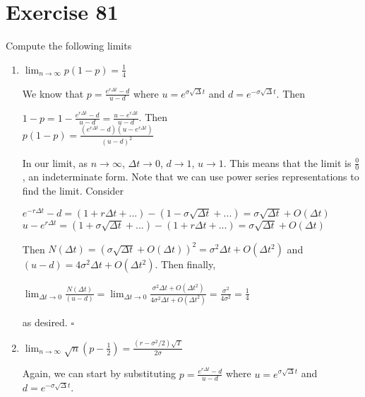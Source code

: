 \documentclass{article}
\begin{document}
\section*{Exercise 81}
Compute the following limits
\begin{enumerate}
    \item $\lim_{n \rightarrow \infty} p(1-p) = \frac{1}{4}$
        \begin{flushleft}
            We know that $p = \frac{e^{r\Delta t} - d}{u-d}$ where $u = e^{\sigma \sqrt{\Delta}t}$ and $d = e^{- \sigma \sqrt{\Delta}t}$. Then
            \begin{center}
                $1-p = 1 - \frac{e^{r\Delta t} - d}{u-d} = \frac{u - e^{r \Delta t}}{u-d}$. Then \\
                $p(1-p) = \frac{(e^{r\Delta t} - d)(u - e^{r \Delta t})}{(u-d)^2}$
            \end{center}
            In our limit, as $n \rightarrow \infty$, $\Delta t \rightarrow 0$, $d \rightarrow 1$, $u \rightarrow 1$. This means that the limit is $\frac{0}{0}$, an indeterminate form.
            Note that we can use power series representations to find the limit. Consider
            \begin{center}
                $e^{-r\Delta t} - d = (1 + r\Delta t + ...) - (1 - \sigma \sqrt{\Delta t} + ...) = \sigma \sqrt{\Delta t} + O(\Delta t)$ \\
                $u - e^{r\Delta t} = (1 + \sigma \sqrt{\Delta t} + ...) - (1 + r\Delta t + ...) = \sigma \sqrt{\Delta t} + O(\Delta t)$
            \end{center}
            Then $N(\Delta t) = (\sigma \sqrt{\Delta t} + O(\Delta t))^2 = \sigma^2 \Delta t + O(\Delta t^2)$ and $(u-d) = 4\sigma^2\Delta t + O(\Delta t^2)$. Then finally,
            \begin{center}
                $\lim_{\Delta t \rightarrow 0} \frac{N(\Delta t)}{(u-d)} = \lim_{\Delta t \rightarrow 0} \frac{\sigma^2 \Delta t + O(\Delta t^2)}{4\sigma^2\Delta t + O(\Delta t^2)} = \frac{\sigma^2}{4\sigma^2} = \frac{1}{4}$
            \end{center}
            as desired. $\square$
        \end{flushleft}
    \item $\lim_{n \rightarrow \infty} \sqrt{n}(p - \frac{1}{2}) = \frac{(r-\sigma^2/2)\sqrt{T}}{2\sigma}$
        \begin{flushleft}
            Again, we can start by substituting $p = \frac{e^{r\Delta t} - d}{u-d}$ where $u = e^{\sigma \sqrt{\Delta}t}$ and $d = e^{- \sigma \sqrt{\Delta}t}$.
        \end{flushleft}
\end{enumerate}
\end{document}
